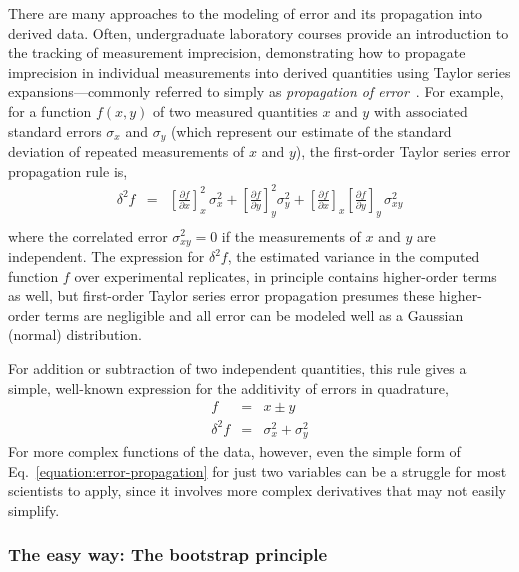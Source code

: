 \documentclass[aps,pre,twocolumn,nofootinbib,superscriptaddress,linenumbers]{revtex4-1}
\begin{document}
There are many approaches to the modeling of error and its propagation into derived data.
Often, undergraduate laboratory courses provide an introduction to the tracking of measurement imprecision, demonstrating how to propagate imprecision in individual measurements into derived quantities using Taylor series expansions---commonly referred to simply as \emph{propagation of error}~\cite{taylor_introduction_1997}.
For example, for a function $f(x,y)$ of two measured quantities $x$ and $y$ with associated standard errors $\sigma_x$ and $\sigma_y$ (which represent our estimate of the standard deviation of repeated measurements of $x$ and $y$), the first-order Taylor series error propagation rule is,
\begin{eqnarray}
\delta^2 f &=& \left[\frac{\partial f}{\partial x}\right]^2_x \, \sigma^2_x + \left[\frac{\partial f}{\partial y}\right]^2_y \sigma^2_y + \left[\frac{\partial f}{\partial x}\right]_x \left[\frac{\partial f}{\partial y}\right]_y \, \sigma^2_{xy} \nonumber \\ \label{equation:error-propagation}
\end{eqnarray}
where the correlated error $\sigma^2_{xy} = 0$ if the measurements of $x$ and $y$ are independent.
The expression for $\delta^2 f$, the estimated variance in the computed function $f$ over experimental replicates, in principle contains higher-order terms as well, but first-order Taylor series error propagation presumes these higher-order terms are negligible and all error can be modeled well as a Gaussian (normal) distribution.

For addition or subtraction of two independent quantities, this rule gives a simple, well-known expression for the additivity of errors in quadrature,
\begin{eqnarray}
f &=& x \pm y \nonumber \\
\delta^2 f &=& \sigma^2_x + \sigma^2_y 
\end{eqnarray}
For more complex functions of the data, however, even the simple form of Eq.~\ref{equation:error-propagation} for just two variables can be a struggle for most scientists to apply, since it involves more complex derivatives that may not easily simplify.

\subsubsection{The easy way: The bootstrap principle}
\end{document}
